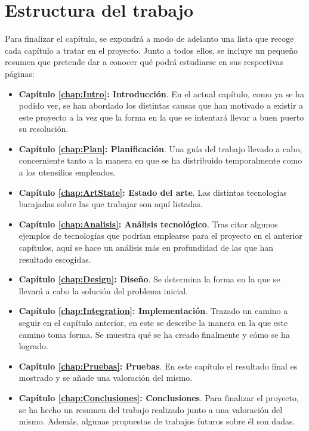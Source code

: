 \section{Estructura del trabajo}
Para finalizar el capítulo, se expondrá a modo de adelanto una lista que recoge cada capítulo a tratar en el proyecto. Junto a todos ellos, se incluye un pequeño resumen que pretende dar a conocer qué podrá estudiarse en sus respectivas páginas:
\begin{itemize}
\item \textbf{Capítulo \ref{chap:Intro}: Introducción}. En el actual capítulo, como ya se ha podido ver, se han abordado los distintas causas que han motivado a existir a este proyecto a la vez que la forma en la que se intentará llevar a buen puerto su resolución.
\item \textbf{Capítulo \ref{chap:Plan}: Planificación}. Una guía del trabajo llevado a cabo, concerniente tanto a la manera en que se ha distribuido temporalmente como a los utensilios empleados.
\item \textbf{Capítulo \ref{chap:ArtState}: Estado del arte}. Las distintas tecnologías barajadas sobre las que trabajar son aquí listadas.
\item \textbf{Capítulo \ref{chap:Analisis}: Análisis tecnológico}. Tras citar algunos ejemplos de tecnologías que podrían emplearse para el proyecto en el anterior capítulos, aquí se hace un análisis más en profundidad de las que han resultado escogidas.
\item \textbf{Capítulo \ref{chap:Design}: Diseño}. Se determina la forma en la que se llevará a cabo la solución del problema inicial.
\item \textbf{Capítulo \ref{chap:Integration}: Implementación}. Trazado un camino a seguir en el capítulo anterior, en este se describe la manera en la que este camino toma forma. Se muestra qué se ha creado finalmente y cómo se ha logrado.
\item \textbf{Capítulo \ref{chap:Pruebas}: Pruebas}. En este capítulo el resultado final es mostrado y se añade una valoración del mismo.
\item \textbf{Capítulo \ref{chap:Conclusiones}: Conclusiones}. Para finalizar el proyecto, se ha hecho un resumen del trabajo realizado junto a una valoración del mismo. Además, algunas propuestas de trabajos futuros sobre él son dadas.
\end{itemize}
